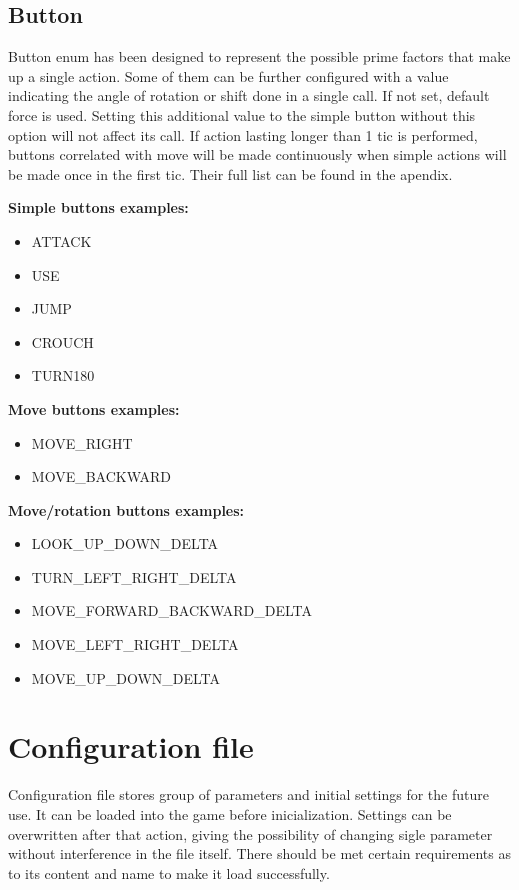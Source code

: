 \subsection{Button} \label{subsec:button}
Button enum has been designed to represent the possible prime factors that make up a single action. Some of them can be further configured with a value indicating the angle of rotation or shift done in a single call. If not set, default force is used. Setting this additional value to the simple button without this option will not affect its call. If action lasting longer than 1 tic is performed, buttons correlated with move will be made continuously when simple actions will be made once in the first tic. Their full list can be found in the apendix.


\vspace{20pt}
\textbf{Simple buttons examples:}
\begin{itemize} 
\item ATTACK
\item USE
\item JUMP
\item CROUCH
\item TURN180
\end{itemize}


\vspace{20pt}
\textbf{Move buttons examples:}
\begin{itemize} 
\item MOVE\_RIGHT
\item MOVE\_BACKWARD
\end{itemize} 


\vspace{20pt}
\textbf{Move/rotation buttons examples:}
\begin{itemize} 
 \item LOOK\_UP\_DOWN\_DELTA
 \item TURN\_LEFT\_RIGHT\_DELTA
 \item MOVE\_FORWARD\_BACKWARD\_DELTA
 \item MOVE\_LEFT\_RIGHT\_DELTA
 \item MOVE\_UP\_DOWN\_DELTA
\end{itemize}

\section{Configuration file}\label{sec:configuration_file}


Configuration file stores group of parameters and initial settings for the future use. It can be loaded into the game before inicialization. Settings can be overwritten after that action, giving the possibility of changing sigle parameter without interference in the file itself. There should be met certain requirements as to its content and name to make it load successfully.

